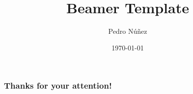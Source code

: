 \documentclass[12pt]{beamer}
\title[Beamer Template]{Beamer Template}
\author{Pedro N\'{u}\~{n}ez}
\institute{Albert-Ludwigs-Universit\"{a}t Freiburg}
\date{\today}
\begin{document}
\frame{\titlepage}

\begin{frame}
    \frametitle{Thanks for your attention!}
    \printbibliography
\end{frame}
\end{document}

